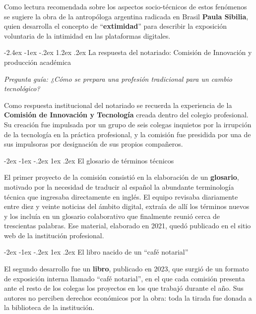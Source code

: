 \documentclass[12pt,oneside]{book}
\makeatletter
\renewcommand\section{\@startsection{section}{1}{\z@}%
  {-2.4ex \@plus -1ex \@minus -.2ex}%
  {1.2ex \@plus .2ex}%
  {\normalfont\Large\bfseries\color{blue!50!black}}}
\renewcommand\subsection{\@startsection{subsection}{2}{\z@}%
  {-2ex \@plus -1ex \@minus -.2ex}%
  {1ex \@plus .2ex}%
  {\normalfont\large\bfseries}}
\newcommand{\guia}[1]{\noindent\textit{Pregunta guía: #1}\par\smallskip}
\makeatother
\begin{document}
Como lectura recomendada sobre los aspectos socio-técnicos de estos fenómenos se sugiere la obra de la antropóloga argentina radicada en Brasil \textbf{Paula Sibilia}, quien desarrolla el concepto de ``\textbf{extimidad}'' para describir la exposición voluntaria de la intimidad en las plataformas digitales.

\section{La respuesta del notariado: Comisión de Innovación y producción académica}

\guia{¿Cómo se prepara una profesión tradicional para un cambio tecnológico?}

Como respuesta institucional del notariado se recuerda la experiencia de la \textbf{Comisión de Innovación y Tecnología} creada dentro del colegio profesional. Su creación fue impulsada por un grupo de seis colegas inquietos por la irrupción de la tecnología en la práctica profesional, y la comisión fue presidida por una de sus impulsoras por designación de sus propios compañeros.

\subsection{El glosario de términos técnicos}

El primer proyecto de la comisión consistió en la elaboración de un \textbf{glosario}, motivado por la necesidad de traducir al español la abundante terminología técnica que ingresaba directamente en inglés. El equipo revisaba diariamente entre diez y veinte noticias del ámbito digital, extraía de allí los términos nuevos y los incluía en un glosario colaborativo que finalmente reunió cerca de trescientas palabras. Ese material, elaborado en 2021, quedó publicado en el sitio web de la institución profesional.

\subsection{El libro nacido de un ``café notarial''}

El segundo desarrollo fue un \textbf{libro}, publicado en 2023, que surgió de un formato de exposición interna llamado ``café notarial'', en el que cada comisión presenta ante el resto de los colegas los proyectos en los que trabajó durante el año. Sus autores no perciben derechos económicos por la obra: toda la tirada fue donada a la biblioteca de la institución.
\end{document}
